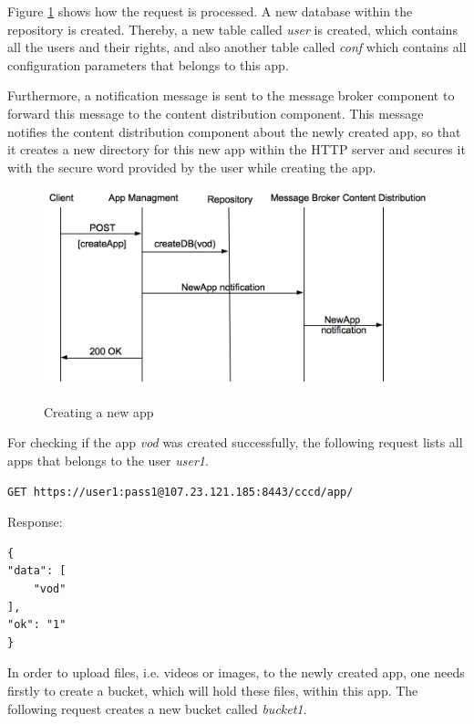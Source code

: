 Figure \ref{fig:newApp} shows how the request is processed. A new database within the repository is created. Thereby, a new table called \textit{user} is created, which contains all the users and their rights, and also another table called \textit{conf} which contains all configuration parameters that belongs to this app.

Furthermore, a notification message is sent to the message broker component to forward this message to the content distribution component. This message notifies the content distribution component about the newly created app, so that it creates a new directory for this new app within the HTTP server and secures it with the secure word provided by the user while creating the app.

\begin{figure}[htb]
  \centering
  \includegraphics[scale=0.6]{flows/newAppFlow.png}\\
  \caption{Creating a new app}
  \label{fig:newApp}
\end{figure}

For checking if the app \textit{vod} was created successfully, the following request lists all apps that belongs to the user \textit{user1}.

\begin{code}
\begin{verbatim}
GET https://user1:pass1@107.23.121.185:8443/cccd/app/
\end{verbatim}
Response:
\begin{verbatim}
{
"data": [
	"vod"
],
"ok": "1"
}
\end{verbatim}
\end{code}
 
In order to upload files, i.e. videos or images, to the newly created app, one needs firstly to create a bucket, which will hold these files, within this app. The following request creates a new bucket called \textit{bucket1}.

